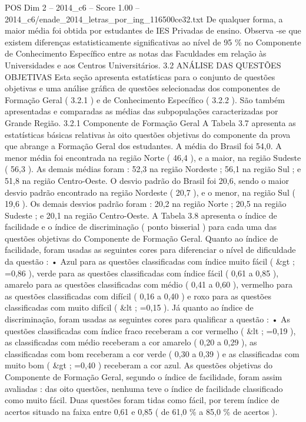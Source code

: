 \begin{textsample}{POS Dim 2 – 2014\_c6 – Score 1.00 – 2014\_c6/enade\_2014\_letras\_por\_ing\_116500ce32.txt}
De qualquer forma, a maior média foi obtida por estudantes de IES Privadas de ensino.
Observa -se que existem diferenças estatisticamente significativas ao nível de 95 \% no Componente de Conhecimento Específico entre as notas das Faculdades em relação às Universidades e aos Centros Universitários. 3.2 ANÁLISE DAS QUESTÕES OBJETIVAS Esta seção apresenta estatísticas para o conjunto de questões objetivas e uma análise gráfica de questões selecionadas dos componentes de Formação Geral ( 3.2.1 ) e de Conhecimento Específico ( 3.2.2 ).
São também apresentadas e comparadas as médias das subpopulações caracterizadas por Grande Região. 3.2.1 Componente de Formação Geral A Tabela 3.7 apresenta as estatísticas básicas relativas às oito questões objetivas do componente da prova que abrange a Formação Geral dos estudantes.
A média do Brasil foi 54,0.
A menor média foi encontrada na região Norte ( 46,4 ), e a maior, na região Sudeste ( 56,3 ).
As demais médias foram : 52,3 na região Nordeste ; 56,1 na região Sul ; e 51,8 na região Centro-Oeste.
O desvio padrão do Brasil foi 20,6, sendo o maior desvio padrão encontrado na região Nordeste ( 20,7 ), e o menor, na região Sul ( 19,6 ).
Os demais desvios padrão foram : 20,2 na região Norte ; 20,5 na região Sudeste ; e 20,1 na região Centro-Oeste.
A Tabela 3.8 apresenta o índice de facilidade e o índice de discriminação ( ponto bisserial ) para cada uma das questões objetivas do Componente de Formação Geral.
Quanto ao índice de facilidade, foram usadas as seguintes cores para diferenciar o nível de dificuldade da questão : • Azul para as questões classificadas com índice muito fácil ( \&gt ; =0,86 ), verde para as questões classificadas com índice fácil ( 0,61 a 0,85 ), amarelo para as questões classificadas com médio ( 0,41 a 0,60 ), vermelho para as questões classificadas com difícil ( 0,16 a 0,40 ) e roxo para as questões classificadas com muito difícil ( \&lt ; =0,15 ).
Já quanto ao índice de discriminação, foram usadas as seguintes cores para qualificar a questão : • As questões classificadas com índice fraco receberam a cor vermelho ( \&lt ; =0,19 ), as classificadas com médio receberam a cor amarelo ( 0,20 a 0,29 ), as classificadas com bom receberam a cor verde ( 0,30 a 0,39 ) e as classificadas com muito bom ( \&gt ; =0,40 ) receberam a cor azul.
As questões objetivas do Componente de Formação Geral, segundo o índice de facilidade, foram assim avaliadas : das oito questões, nenhuma teve o índice de facilidade classificado como muito fácil.
Duas questões foram tidas como fácil, por terem índice de acertos situado na faixa entre 0,61 e 0,85 ( de 61,0 \% a 85,0 \% de acertos ).

\end{textsample}
